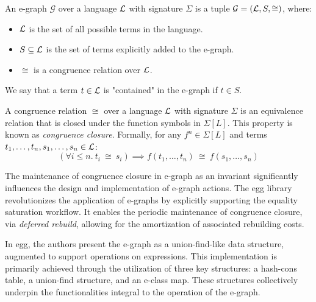 \begin{definition}[E-graph]
An e-graph $\mathcal{G}$ over a language $\mathcal{L}$ with signature $\Sigma$ is a tuple $\mathcal{G} = (\mathcal{L}, S, \cong)$, where:
\begin{itemize}
    \item $\mathcal{L}$ is the set of all possible terms in the language.
    \item $S \subseteq \mathcal{L}$ is the set of terms explicitly added to the e-graph.
    \item $\cong$ is a congruence relation over $\mathcal{L}$.
\end{itemize}
We say that a term $t \in \mathcal{L}$ is "contained" in the e-graph if $t \in S$.
\end{definition}

\begin{definition}
A congruence relation $\cong$ over a language $\mathcal{L}$ with signature $\Sigma$ is an equivalence relation that is closed under the function symbols in $\Sigma[L]$.
This property is known as \emph{congruence closure}. 
Formally, for any $f^n \in \Sigma[L]$ and terms $t_1, \ldots, t_n, s_1, \ldots, s_n \in \mathcal{L}$:
\[
(\forall i \leq n.~t_i~\cong~s_i) \implies f(t_1, \ldots, t_n)~\cong~f(s_1, \ldots, s_n)
\]
\end{definition}

The maintenance of congruence closure in e-graph as an invariant significantly influences the design and implementation of e-graph actions.
The egg library~\cite{egg} revolutionizes the application of e-graphs by explicitly supporting the equality saturation workflow.
It enables the periodic maintenance of congruence closure, via \emph{deferred rebuild}, allowing for the amortization of associated rebuilding costs.

In egg, the authors present the e-graph as a union-find-like data structure, augmented to support operations on expressions.
This implementation is primarily achieved through the utilization of three key structures: a hash-cons table, a union-find structure, and an e-class map.
These structures collectively underpin the functionalities integral to the operation of the e-graph.

